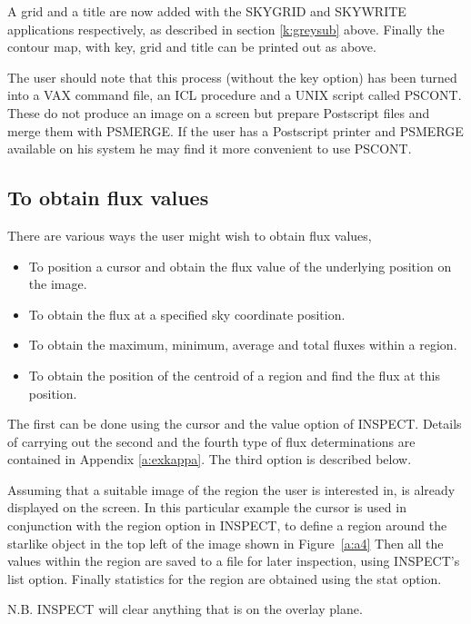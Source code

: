 \documentclass[twoside,11pt]{starlink}
\begin{document}
A grid and a title are now added with the SKYGRID and SKYWRITE applications
respectively, as described in section \ref {k:greysub} above. Finally the
contour map, with key, grid and title can be printed out as above.

The user should note that this process (without the key option) has been turned
into a VAX command file, an ICL procedure and a UNIX script called PSCONT.
These do not produce an image on a screen but prepare Postscript files and merge
them with PSMERGE. If the user has a Postscript printer and PSMERGE
available on his system he may find it more convenient to use PSCONT.

\subsection{To obtain flux values}
\label{k:flux}
There are various ways the user might wish to obtain flux values,
\begin{itemize}
\item To position a cursor and obtain the flux value of the underlying
position on the image.
\item To obtain the flux at a specified sky coordinate position.
\item To obtain the maximum, minimum, average and total fluxes within a region.
\item To obtain the position of the centroid of a region and find the flux at
this position.
\end{itemize}
The first can be done using the cursor and the value option of INSPECT. Details
of carrying out the second and the fourth type of flux determinations are
contained in Appendix \ref{a:exkappa}. The third option is described below.

Assuming that a suitable image of the region the user is interested in, is
already displayed on the screen. In this particular example the cursor is used
in conjunction with the region option in INSPECT, to define a region around
the starlike object in the top left of the image shown in Figure~\ref{a:a4}
Then all the values within the region are saved to a file for later inspection,
using INSPECT's list option. Finally statistics for the region are obtained
using the stat option.

N.B. INSPECT will clear anything that is on the overlay plane.
\end{document}
